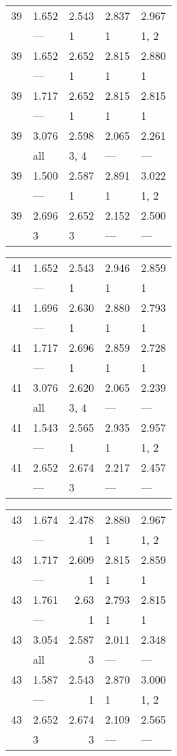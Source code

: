 \begin{tabular}{lllll}
\toprule
 39 & 1.652 & 2.543 & 2.837 & 2.967 \\
    & ---   & 1     & 1     & 1, 2  \\
 39 & 1.652 & 2.652 & 2.815 & 2.880 \\
    & ---   & 1     & 1     & 1     \\
 39 & 1.717 & 2.652 & 2.815 & 2.815 \\
    & ---   & 1     & 1     & 1     \\
 39 & 3.076 & 2.598 & 2.065 & 2.261 \\
    & all   & 3, 4  & ---   & ---   \\
 39 & 1.500 & 2.587 & 2.891 & 3.022 \\
    & ---   & 1     & 1     & 1, 2  \\
 39 & 2.696 & 2.652 & 2.152 & 2.500 \\
    & 3     & 3     & ---   & ---   \\
\bottomrule
\end{tabular}
\begin{tabular}{lllll}
\toprule
 41 & 1.652 & 2.543 & 2.946 & 2.859 \\
    & ---   & 1     & 1     & 1     \\
 41 & 1.696 & 2.630 & 2.880 & 2.793 \\
    & ---   & 1     & 1     & 1     \\
 41 & 1.717 & 2.696 & 2.859 & 2.728 \\
    & ---   & 1     & 1     & 1     \\
 41 & 3.076 & 2.620 & 2.065 & 2.239 \\
    & all   & 3, 4  & ---   & ---   \\
 41 & 1.543 & 2.565 & 2.935 & 2.957 \\
    & ---   & 1     & 1     & 1, 2  \\
 41 & 2.652 & 2.674 & 2.217 & 2.457 \\
    & ---   & 3     & ---   & ---   \\
\bottomrule
\end{tabular}
\begin{tabular}{llrll}
\toprule
 43 & 1.674 & 2.478 & 2.880 & 2.967 \\
    & ---   & 1     & 1     & 1, 2  \\
 43 & 1.717 & 2.609 & 2.815 & 2.859 \\
    & ---   & 1     & 1     & 1     \\
 43 & 1.761 & 2.63  & 2.793 & 2.815 \\
    & ---   & 1     & 1     & 1     \\
 43 & 3.054 & 2.587 & 2.011 & 2.348 \\
    & all   & 3     & ---   & ---   \\
 43 & 1.587 & 2.543 & 2.870 & 3.000 \\
    & ---   & 1     & 1     & 1, 2  \\
 43 & 2.652 & 2.674 & 2.109 & 2.565 \\
    & 3     & 3     & ---   & ---   \\
\bottomrule
\end{tabular}
